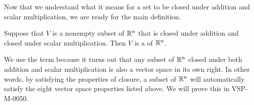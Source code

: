 \documentclass{ximera}
\begin{document}
Now that we understand what it means for a set to be closed under addition and scalar multiplication, we are ready for the main definition.



\begin{definition}\label{def:subspace} Suppose that $V$ is a nonempty subset of $\mathbb{R}^n$ that is closed under addition and closed under scalar multiplication.  Then $V$ is a  of $\mathbb{R}^n$.
\end{definition}
We use the term  because it turns out that any subset of $\mathbb{R}^n$ closed under both addition and scalar multiplication is also a vector space in its own right.  In other words, by satisfying the properties of closure, a subset of $\mathbb{R}^n$ will automatically satisfy the eight vector space properties listed above.  We will prove this in VSP-M-0050.
\end{document}
